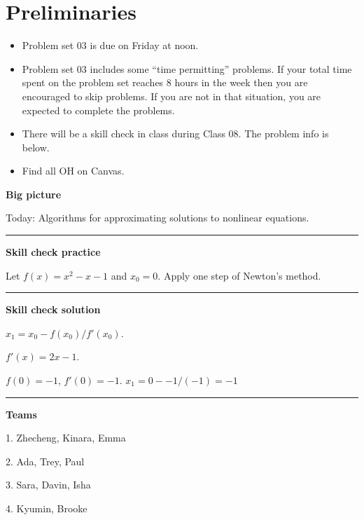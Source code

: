 \documentclass[12pt,letterpaper,noanswers]{exam}
\begin{document}
 \pdfpageheight 11in 
  \pdfpagewidth 8.5in

\noindent 

\section*{Preliminaries}

\begin{itemize}
\itemsep0pt
\item Problem set 03 is due on Friday at noon.
\item Problem set 03 includes some ``time permitting'' problems.  If your total time spent on the problem set reaches 8 hours in the week then you are encouraged to skip problems.  If you are not in that situation, you are expected to complete the problems.
\item There will be a skill check in class during Class 08.  The problem info is below.
\item Find all OH on Canvas.
\end{itemize}



\noindent\textbf{Big picture}

Today: Algorithms for approximating solutions to nonlinear equations.

\vspace{0.2cm}
\hrule
\vspace{0.2cm}

\noindent \textbf{Skill check practice}
\begin{questions}
\item Let $f(x) = x^2 -x -1$ and $x_0 = 0$.  Apply one step of Newton's method.
\end{questions}


\vspace{0.2cm}
\hrule
\vspace{0.2cm}

\noindent \textbf{Skill check solution}
\begin{questions}
\item $x_1 = x_0 - f(x_0)/f'(x_0)$.  

$f'(x) = 2x - 1$.

$f(0) = -1$, $f'(0) = -1$.  $x_1 = 0 - -1/(-1) = -1$

\end{questions}
\vspace{0.2cm}
\hrule
\vspace{0.2cm}
\noindent\textbf{Teams}
\begin{multicols}{2}
1. Zhecheng, Kinara, Emma

2. Ada, Trey, Paul

3. Sara, Davin, Isha

4. Kyumin, Brooke
\end{multicols}
\end{document}
